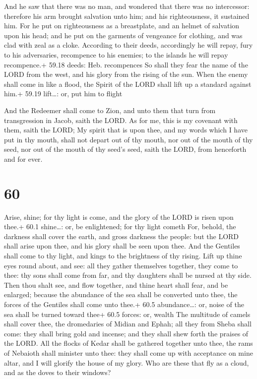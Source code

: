  And he saw that there was no man, and wondered that
there was no intercessor: therefore his arm brought salvation unto him;
and his righteousness, it sustained him.  For he put on
righteousness as a breastplate, and an helmet of salvation upon his
head; and he put on the garments of vengeance for clothing, and was clad
with zeal as a cloke.  According to their deeds,
accordingly he will repay, fury to his adversaries, recompence to his
enemies; to the islands he will repay recompence.+ 59.18 deeds: Heb.
recompences  So shall they fear the name of the LORD from
the west, and his glory from the rising of the sun. When the enemy shall
come in like a flood, the Spirit of the LORD shall lift up a standard
against him.+ 59.19 lift\ldots: or, put him to flight

 And the Redeemer shall come to Zion, and unto them that
turn from transgression in Jacob, saith the LORD.  As for
me, this is my covenant with them, saith the LORD; My spirit that is
upon thee, and my words which I have put in thy mouth, shall not depart
out of thy mouth, nor out of the mouth of thy seed, nor out of the mouth
of thy seed's seed, saith the LORD, from henceforth and for ever.

\hypertarget{section-59}{%
\section{60}\label{section-59}}

 Arise, shine; for thy light is come, and the glory of the
LORD is risen upon thee.+ 60.1 shine\ldots: or, be enlightened; for thy
light cometh  For, behold, the darkness shall cover the
earth, and gross darkness the people: but the LORD shall arise upon
thee, and his glory shall be seen upon thee.  And the
Gentiles shall come to thy light, and kings to the brightness of thy
rising.  Lift up thine eyes round about, and see: all they
gather themselves together, they come to thee: thy sons shall come from
far, and thy daughters shall be nursed at thy side.  Then
thou shalt see, and flow together, and thine heart shall fear, and be
enlarged; because the abundance of the sea shall be converted unto thee,
the forces of the Gentiles shall come unto thee.+ 60.5 abundance\ldots:
or, noise of the sea shall be turned toward thee+ 60.5 forces: or,
wealth  The multitude of camels shall cover thee, the
dromedaries of Midian and Ephah; all they from Sheba shall come: they
shall bring gold and incense; and they shall shew forth the praises of
the LORD.  All the flocks of Kedar shall be gathered
together unto thee, the rams of Nebaioth shall minister unto thee: they
shall come up with acceptance on mine altar, and I will glorify the
house of my glory.  Who are these that fly as a cloud, and
as the doves to their windows?


